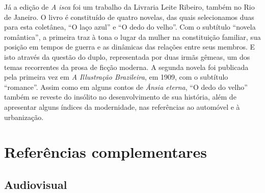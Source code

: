 \documentclass[12pt]{extarticle}
\begin{document}
Já a edição de \emph{A isca} foi um trabalho da Livraria Leite Ribeiro,
também no Rio de Janeiro. O livro é constituído de quatro novelas, das
quais selecionamos duas para esta coletânea, ``O laço azul'' e ``O dedo
do velho''. Com o subtítulo ``novela romântica'', a primeira traz à tona
o lugar da mulher na constituição familiar, sua posição em tempos de
guerra e as dinâmicas das relações entre seus membros. E isto através da
questão do duplo, representada por duas irmãs gêmeas, um dos temas
recorrentes da prosa de ficção moderna. A segunda novela foi publicada
pela primeira vez em \emph{A Illustração Brazileira}, em 1909, com o
subtítulo ``romance''. Assim como em alguns contos de \emph{Ânsia
eterna}, ``O dedo do velho'' também se reveste do insólito no
desenvolvimento de sua história, além de apresentar alguns índices da
modernidade, nas referências ao automóvel e à urbanização.

\section{Referências complementares}

\subsection{Audiovisual}
\end{document}
